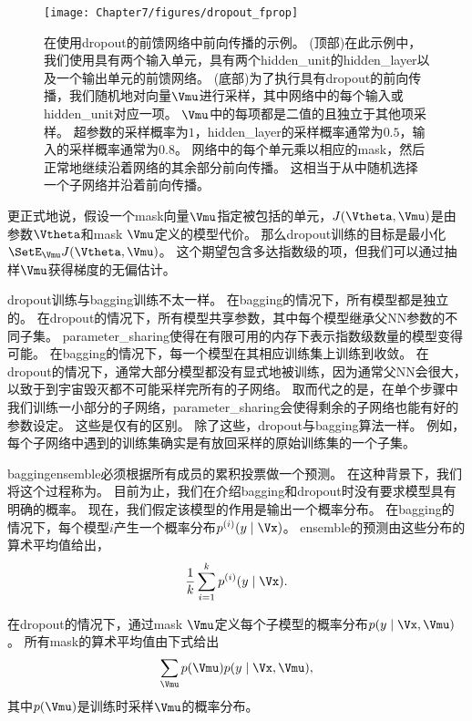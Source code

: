 \begin{figure}[!htb]
\else
\centerline{\texttt{[image: Chapter7/figures/dropout\_fprop]}}
\fi
\caption{在使用\gls{dropout}的前馈网络中前向传播的示例。
(顶部)在此示例中，我们使用具有两个输入单元，具有两个\gls{hidden_unit}的\gls{hidden_layer}以及一个输出单元的前馈网络。
(底部)为了执行具有\gls{dropout}的前向传播，我们随机地对向量$\Vmu$进行采样，其中网络中的每个输入或\gls{hidden_unit}对应一项。
$\Vmu$中的每项都是二值的且独立于其他项采样。
超参数的采样概率为$1$，\gls{hidden_layer}的采样概率通常为$0.5$，输入的采样概率通常为$0.8$。
网络中的每个单元乘以相应的\gls{mask}，然后正常地继续沿着网络的其余部分前向传播。
这相当于从中随机选择一个子网络并沿着前向传播。
}
\label{fig:chap7_dropout_fprop}
\end{figure}

更正式地说，假设一个\gls{mask}向量$\Vmu$指定被包括的单元，$J(\Vtheta, \Vmu)$是由参数$\Vtheta$和\gls{mask} $\Vmu$定义的模型代价。
那么\gls{dropout}训练的目标是最小化$\SetE_{\Vmu} J(\Vtheta, \Vmu)$。 
这个期望包含多达指数级的项，但我们可以通过抽样$\Vmu$获得梯度的无偏估计。

\gls{dropout}训练与\gls{bagging}训练不太一样。
在\gls{bagging}的情况下，所有模型都是独立的。
在\gls{dropout}的情况下，所有模型共享参数，其中每个模型继承父\gls{NN}参数的不同子集。
\gls{parameter_sharing}使得在有限可用的内存下表示指数级数量的模型变得可能。
在\gls{bagging}的情况下，每一个模型在其相应训练集上训练到收敛。
在\gls{dropout}的情况下，通常大部分模型都没有显式地被训练，因为通常父\gls{NN}会很大，以致于到宇宙毁灭都不可能采样完所有的子网络。
取而代之的是，在单个步骤中我们训练一小部分的子网络，\gls{parameter_sharing}会使得剩余的子网络也能有好的参数设定。
这些是仅有的区别。
除了这些，\gls{dropout}与\gls{bagging}算法一样。
例如，每个子网络中遇到的训练集确实是有放回采样的原始训练集的一个子集。

\gls{bagging}\gls{ensemble}必须根据所有成员的累积投票做一个预测。
在这种背景下，我们将这个过程称为。
目前为止，我们在介绍\gls{bagging}和\gls{dropout}时没有要求模型具有明确的概率。
现在，我们假定该模型的作用是输出一个概率分布。
在\gls{bagging}的情况下，每个模型$i$产生一个概率分布$p^{(i)}(y \mid \Vx)$。 
\gls{ensemble}的预测由这些分布的算术平均值给出，
\begin{align}
 \frac{1}{k} \sum_{i=1}^k p^{(i)}(y \mid \Vx).
\end{align}

在\gls{dropout}的情况下，通过\gls{mask} $\Vmu$定义每个子模型的概率分布$p(y \mid \Vx, \Vmu)$。
所有\gls{mask}的算术平均值由下式给出
\begin{align}
  \sum_{\Vmu} p(\Vmu) p(y \mid \Vx, \Vmu),
\end{align}
其中$p(\Vmu)$是训练时采样$\Vmu$的概率分布。

